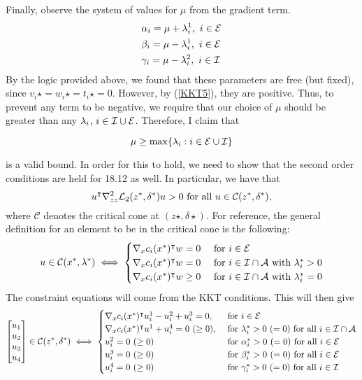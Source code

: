 \begin{solution}
    \newpage
    Finally, observe the system of values for $\mu$ from the gradient term. 
    \begin{align*}
        &\alpha_i  = \mu + \mathrm{\lambda}^1_i, \ i \in \mathcal{E}\\
        &\beta_i = \mu - \mathrm{\lambda}_i^1, \ i \in \mathcal{E}\\
        &\gamma_i = \mu - \mathrm{\lambda}_i^2, \ i \in \mathcal{I}
    \end{align*}
    By the logic provided above, we found that these parameters are free (but fixed), since $v_i\star = w_i\star = t_i\star = 0$. However, by (\ref{KKT5}), they are positive. Thus, to prevent any term to be negative, we require that our choice of $\mu$ should be greater than any $\mathrm{\lambda}_i$, $i \in \mathcal{I} \cup \mathcal{E}$. Therefore, I claim that 
    
    \[\mu \geq \max\{\mathrm{\lambda}_i : i \in \mathcal{E} \cup \mathcal{I}\}\]
    
    is a valid bound. In order for this to hold, we need to show that the second order conditions are held for 18.12 as well. In particular, we have that 
    \[u^{\intercal}\nabla^2_{zz}\mathcal{L}_2(z^{*}, \delta^{*}) u > 0 \text{ for all } u \in \mathcal{C}(z^{*}, \delta^{*}),\]
    where $\mathcal{C}$ denotes the critical cone at $(z\star, \delta\star)$. For reference, the general definition for an element to be in the critical cone is the following:
    \[u \in \mathcal{C}(x^{*}, \mathrm{\lambda}^{*}) \iff \begin{cases}
    \nabla_x c_i(x^{*})^{\intercal} w = 0 &\text{ for } i \in \mathcal{E}\\
    \nabla_x c_i(x^{*})^{\intercal} w = 0 &\text{ for } i \in \mathcal{I} \cap \mathcal{A} \text{ with } \mathrm{\lambda}_i^{*} > 0\\
    \nabla_x c_i(x^{*})^{\intercal} w \geq 0 &\text{ for } i \in \mathcal{I} \cap \mathcal{A} \text{ with } \mathrm{\lambda}_i^{*} = 0\\ 
    \end{cases}
    \]
    The constraint equations will come from the KKT conditions. This will then give
    \[\mqty[u_1\\u_2\\u_3\\u_4] \in \mathcal{C}(z\star, \delta\star) \iff \begin{cases}
        \grad_x c_i(x\star)\T u_i^1 - u^2_i + u^3_i = 0, &\text{ for } i \in \scE\\
        \grad_xc_i(x\star)\T u^1 + u^4_i = 0 \ (\geq 0), &\text{ for } \lm_i\star > 0 \ ( = 0) \text{ for all } i \in \scI \cap \scA\\
        u_i^2 = 0 \ ( \geq 0) &\text{ for } \alpha_i\star > 0 \ (= 0) \text{ for all } i \in \scE\\
        u_i^3 = 0 \ (\geq 0) &\text{ for } \beta_i\star > 0 \ (= 0) \text{ for all } i \in \scE\\
        u_i^4 = 0 \ (\geq 0) &\text{ for } \gamma_i\star > 0 \ (= 0) \text{ for all } i \in \scI
    \end{cases}\]


\end{solution}
